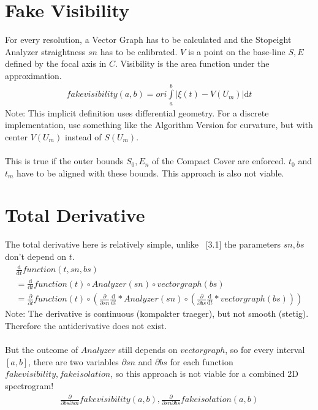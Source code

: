 \documentclass{report}
\begin{document}
\section{Fake Visibility}
For every resolution, a Vector Graph has to be calculated and the Stopeight Analyzer straightness $sn$ has to be calibrated. $V$ is a point on the base-line $S,E$ defined by the focal axis in $C$.
Visibility is the area function under the approximation.
\begin{align}
fakevisibility(a,b)= ori \int \limits _{a}^{b} \vert \xi(t)-V(U_{m})\vert  \mathrm{d}t
\end{align}
Note: This implicit definition uses differential geometry. For a discrete implementation, use something like the Algorithm Version for curvature, but with center $V(U_{m})$ instead of $S(U_{m})$.\\\\
This is true if the outer bounds $S_{0},E_{n}$ of the Compact Cover are enforced. $t_{0}$ and $t_{m}$ have to be aligned with these bounds.
This approach is also not viable.

\section{Total Derivative}
The total derivative here is relatively simple, unlike ~\cite{Analyzer}[3.1] the parameters $sn,bs$ don't depend on $t$.
\begin{align}
\frac{\mathrm{d}}{\mathrm{d} t} function(t,sn,bs)\\
= \frac{\mathrm{d}}{\mathrm{d} t} function(t) \circ Analyzer(sn) \circ vectorgraph(bs)\\
= \frac{\partial}{\partial t} function(t) \circ ( \frac{\partial}{\partial sn}  \frac{\mathrm{d} }{\mathrm{d}t} * Analyzer(sn) \circ (\frac{\partial}{\partial bs} \frac{\mathrm{d}}{\mathrm{d}t}*vectorgraph(bs)) )
\end{align}
Note: The derivative is continuous (kompakter traeger), but not smooth (stetig). Therefore the antiderivative does not exist.\\\\
But the outcome of $Analyzer$ still depends on $vectorgraph$, so for every interval $[a,b]$, there are two variables $\partial sn$ and $\partial bs$ for each function $fake visibility, fake isolation$, so this approach is not viable for a combined 2D spectrogram!
\begin{align}
\frac{\partial}{\partial bs\partial sn} fakevisibility(a,b),\frac{\partial}{\partial sn\partial bs} fakeisolation(a,b)
\end{align}
\end{document}

